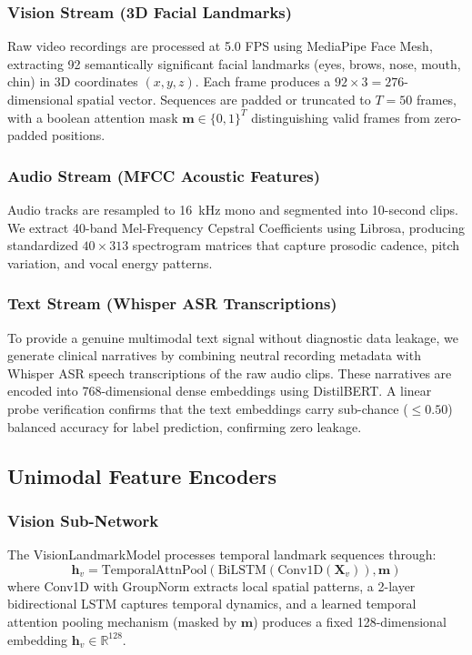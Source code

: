 \documentclass[conference]{IEEEtran}
\begin{document}
\subsubsection{Vision Stream (3D Facial Landmarks)}
Raw video recordings are processed at 5.0 FPS using MediaPipe Face Mesh, extracting 92 semantically significant facial landmarks (eyes, brows, nose, mouth, chin) in 3D coordinates $(x, y, z)$. Each frame produces a $92 \times 3 = 276$-dimensional spatial vector. Sequences are padded or truncated to $T=50$ frames, with a boolean attention mask $\mathbf{m} \in \{0, 1\}^{T}$ distinguishing valid frames from zero-padded positions.

\subsubsection{Audio Stream (MFCC Acoustic Features)}
Audio tracks are resampled to 16~kHz mono and segmented into 10-second clips. We extract 40-band Mel-Frequency Cepstral Coefficients using Librosa, producing standardized $40 \times 313$ spectrogram matrices that capture prosodic cadence, pitch variation, and vocal energy patterns.

\subsubsection{Text Stream (Whisper ASR Transcriptions)}
To provide a genuine multimodal text signal without diagnostic data leakage, we generate clinical narratives by combining neutral recording metadata with Whisper ASR speech transcriptions of the raw audio clips. These narratives are encoded into 768-dimensional dense embeddings using DistilBERT. A linear probe verification confirms that the text embeddings carry sub-chance ($\leq 0.50$) balanced accuracy for label prediction, confirming zero leakage.

\subsection{Unimodal Feature Encoders}

\subsubsection{Vision Sub-Network}
The VisionLandmarkModel processes temporal landmark sequences through:
\begin{equation}
    \mathbf{h}_v = \text{TemporalAttnPool}(\text{BiLSTM}(\text{Conv1D}(\mathbf{X}_v)), \mathbf{m})
\end{equation}
where Conv1D with GroupNorm extracts local spatial patterns, a 2-layer bidirectional LSTM captures temporal dynamics, and a learned temporal attention pooling mechanism (masked by $\mathbf{m}$) produces a fixed 128-dimensional embedding $\mathbf{h}_v \in \mathbb{R}^{128}$.
\end{document}
